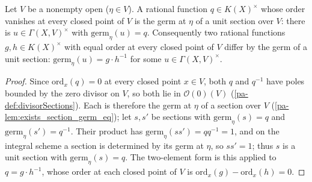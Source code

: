 \begin{lemma}
  \label{pa-lem:exists_germGenericUnits_ordMatch}
  \leanok

  Let \(V\) be a nonempty open (\(\eta \in V\)). A rational function \(q \in K(X)^{\times}\) whose
  order vanishes at every closed point of \(V\) is the germ at \(\eta\) of a unit section over
  \(V\): there is \(u \in \Gamma(X,V)^{\times}\) with \(\mathrm{germ}_\eta(u) = q\). Consequently
  two rational functions \(g, h \in K(X)^{\times}\) with equal order at every closed point of
  \(V\) differ by the germ of a unit section: \(\mathrm{germ}_\eta(u) = g \cdot h^{-1}\) for some
  \(u \in \Gamma(X,V)^{\times}\).
\end{lemma}
\begin{proof}
  \leanok
  Since \(\mathrm{ord}_x(q) = 0\) at every closed point \(x \in V\), both \(q\) and \(q^{-1}\) have
  poles bounded by the zero divisor on \(V\), so both lie in \(\mathcal O(0)(V)\)
  (\ref{pa-def:divisorSections}). Each is therefore the germ at \(\eta\) of a section over \(V\)
  (\ref{pa-lem:exists_section_germ_eq}); let \(s, s'\) be sections with \(\mathrm{germ}_\eta(s) = q\)
  and \(\mathrm{germ}_\eta(s') = q^{-1}\). Their product has \(\mathrm{germ}_\eta(s s') = q q^{-1}
  = 1\), and on the integral scheme a section is determined by its germ at \(\eta\), so \(s s' =
  1\); thus \(s\) is a unit section with \(\mathrm{germ}_\eta(s) = q\). The two-element form is
  this applied to \(q = g \cdot h^{-1}\), whose order at each closed point of \(V\) is
  \(\mathrm{ord}_x(g) - \mathrm{ord}_x(h) = 0\).
\end{proof}

